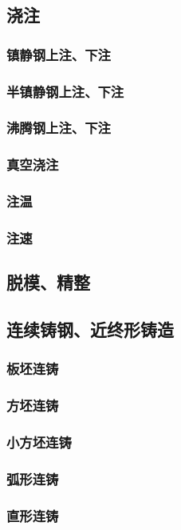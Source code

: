 \documentclass[UTF8]{../../ApplicationUniverse}
\begin{document}
    \subsection{浇注}
        \subsubsection{镇静钢上注、下注}
        \subsubsection{半镇静钢上注、下注}
        \subsubsection{沸腾钢上注、下注}
        \subsubsection{真空浇注}
        \subsubsection{注温}
        \subsubsection{注速}
    \subsection{脱模、精整}
    \subsection{连续铸钢、近终形铸造}
        \subsubsection{板坯连铸}
        \subsubsection{方坯连铸}
        \subsubsection{小方坯连铸}
        \subsubsection{弧形连铸}
        \subsubsection{直形连铸}
\end{document}
